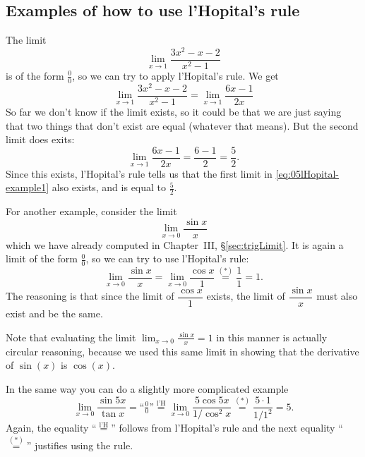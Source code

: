  
\subsection{Examples of how to use l'Hopital's rule} %
The limit
\[
\lim_{x\to 1} \frac{3x^2-x-2} {x^2-1}
\]
is of the form $\frac{0} {0}$, so we can try to apply l'Hopital's rule.  We
get
\begin{equation}
\lim_{x\to 1} \frac{3x^2-x-2} {x^2-1}
=
\lim_{x\to 1} \frac{6x-1} {2x}
\label{eq:05lHopital-example1}
\end{equation}
So far we don't know if the limit exists, so it could be that we are
just saying that two things that don't exist are equal (whatever that
means).  But the second limit does exits:
\[
\lim_{x\to 1} \frac{6x-1} {2x} = \frac{6-1} {2} = \frac{5} {2}.
\]
Since this exists, l'Hopital's rule tells us that
the first limit in \eqref{eq:05lHopital-example1} also exists, and is
equal to $\frac52$.




For another example, consider the limit
\[
\lim_{x\to 0} \frac{\sin x} {x}
\]
which we have already computed in Chapter~III, \S\ref{sec:trigLimit}.  It is again
a limit of the form $\frac00$, so we can try to use l'Hopital's rule:
\[
\lim_{x\to 0} \frac{\sin x} {x} = \lim_{x\to0} \frac{\cos x} {1}
\stackrel{(*)}= \frac{1} {1} =1.
\]
The reasoning is that since the limit of $\dfrac{\cos x} {1}$ exists,
the limit of $\dfrac{\sin x}x$ must also exist and be the same.


Note that evaluating the limit $\lim_{x\to 0} \frac{\sin x} {x} = 1$ in this manner is actually circular reasoning, because we used this same limit in showing that the derivative of $\sin(x)$ is $\cos(x)$.


In the same way you can do a slightly more complicated example
\[
\lim_{x\to 0} \frac{\sin 5x} {\tan x}
=\text{``}\tfrac00\text{''}
\stackrel{\text{l'H}}=
\lim_{x\to0} \frac{5\cos 5x} {1/\cos^2x}
\stackrel{{(*)}}= \frac{5\cdot 1} {1/1^2} = 5.
\]
Again, the equality ``$\stackrel{\text{l'H}}=$''  follows from
l'Hopital's rule and the next equality ``$\stackrel{(*)}=$'' justifies
using the rule.




